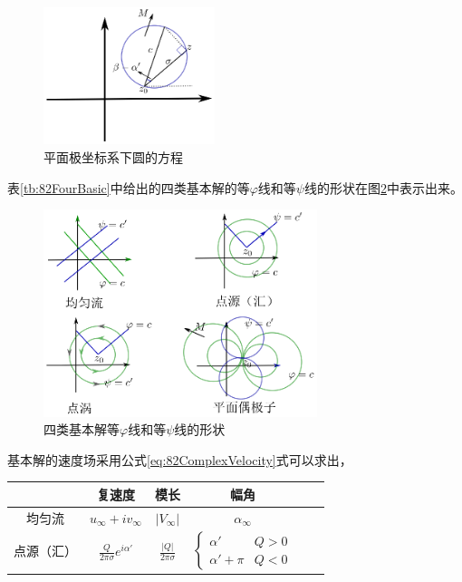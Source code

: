 \begin{figure}[!ht]
 \centering
 \includegraphics[width=5cm]{circleInPlanarCoordinate.eps}
 \caption{平面极坐标系下圆的方程}\label{fig:82circleInPlanarCoordinate}
\end{figure}

表\ref{tb:82FourBasic}中给出的四类基本解的等$\varphi$线和等$\psi$线的形状在图\ref{fig:82basicSolutionComplexPotential}中表示出来。

\begin{figure}[!ht]
 \centering
 \includegraphics[width=8cm]{basicSolutionComplexPotential.eps}
 \caption{四类基本解等$\varphi$线和等$\psi$线的形状}\label{fig:82basicSolutionComplexPotential}
\end{figure}

基本解的速度场采用公式\eqref{eq:82ComplexVelocity}式可以求出，
\begin{table}[!ht]
\centering
\begin{tabular}{cccccc}
\hline
&复速度 & 模长 & 幅角\\
\hline
均匀流 & $u_{\infty}+i v_{\infty}$ & $|V_{\infty}|$ & $\alpha_{\infty}$\\
点源（汇） & $\frac{Q}{2\pi \sigma} e^{i\alpha'}$ & $\frac{|Q|}{2\pi \sigma}$ & $\begin{cases}\alpha'&Q>0\\\alpha'+\pi&Q<0\end{cases}$ \\
\hline
\end{tabular}
\end{table}
\begin{equation}
\end{equation}
\begin{equation}
\end{equation}
\begin{equation}
\end{equation}
\begin{equation}
\end{equation}
\begin{equation}
\end{equation}
